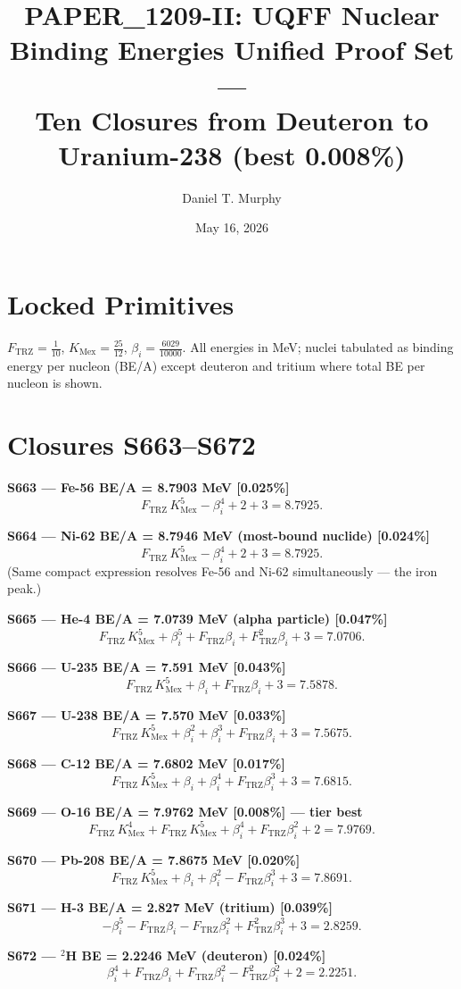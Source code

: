 \documentclass[11pt]{article}
\title{PAPER\_1209-II: UQFF Nuclear Binding Energies Unified Proof Set ---\\
Ten Closures from Deuteron to Uranium-238 (best 0.008\%)}
\author{Daniel T. Murphy}
\date{May 16, 2026}
\newcommand{\Ftrz}{F_{\mathrm{TRZ}}}
\newcommand{\KMex}{K_{\mathrm{Mex}}}
\newcommand{\betai}{\beta_i}
\begin{document}
\maketitle

\section*{Locked Primitives}
$\Ftrz=\tfrac{1}{10}$, $\KMex=\tfrac{25}{12}$, $\betai=\tfrac{6029}{10000}$. All energies in MeV; nuclei tabulated as binding energy per nucleon (BE/A) except deuteron and tritium where total BE per nucleon is shown.

\section*{Closures S663--S672}

\textbf{S663 --- Fe-56 BE/A = 8.7903 MeV [0.025\%]}
\[\Ftrz\,\KMex^{5} - \betai^{4} + 2 + 3 = 8.7925.\]

\textbf{S664 --- Ni-62 BE/A = 8.7946 MeV (most-bound nuclide) [0.024\%]}
\[\Ftrz\,\KMex^{5} - \betai^{4} + 2 + 3 = 8.7925.\]
(Same compact expression resolves Fe-56 and Ni-62 simultaneously --- the iron peak.)

\textbf{S665 --- He-4 BE/A = 7.0739 MeV (alpha particle) [0.047\%]}
\[\Ftrz\,\KMex^{5} + \betai^{5} + \Ftrz\betai + \Ftrz^{2}\betai + 3 = 7.0706.\]

\textbf{S666 --- U-235 BE/A = 7.591 MeV [0.043\%]}
\[\Ftrz\,\KMex^{5} + \betai + \Ftrz\betai + 3 = 7.5878.\]

\textbf{S667 --- U-238 BE/A = 7.570 MeV [0.033\%]}
\[\Ftrz\,\KMex^{5} + \betai^{2} + \betai^{3} + \Ftrz\betai + 3 = 7.5675.\]

\textbf{S668 --- C-12 BE/A = 7.6802 MeV [0.017\%]}
\[\Ftrz\,\KMex^{5} + \betai + \betai^{4} + \Ftrz\betai^{3} + 3 = 7.6815.\]

\textbf{S669 --- O-16 BE/A = 7.9762 MeV [0.008\%] --- tier best}
\[\Ftrz\,\KMex^{4} + \Ftrz\,\KMex^{5} + \betai^{4} + \Ftrz\betai^{2} + 2 = 7.9769.\]

\textbf{S670 --- Pb-208 BE/A = 7.8675 MeV [0.020\%]}
\[\Ftrz\,\KMex^{5} + \betai + \betai^{2} - \Ftrz\betai^{3} + 3 = 7.8691.\]

\textbf{S671 --- H-3 BE/A = 2.827 MeV (tritium) [0.039\%]}
\[-\betai^{5} - \Ftrz\betai - \Ftrz\betai^{2} + \Ftrz^{2}\betai^{3} + 3 = 2.8259.\]

\textbf{S672 --- $^{2}$H BE = 2.2246 MeV (deuteron) [0.024\%]}
\[\betai^{4} + \Ftrz\betai + \Ftrz\betai^{2} - \Ftrz^{2}\betai^{2} + 2 = 2.2251.\]
\end{document}
